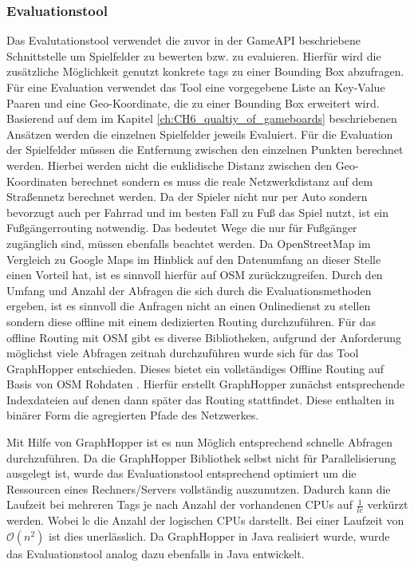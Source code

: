 \subsubsection*{Evaluationstool}

Das Evalutationstool verwendet die zuvor in der GameAPI beschriebene Schnittstelle um Spielfelder zu bewerten bzw. zu evaluieren. Hierfür wird die zusätzliche Möglichkeit genutzt konkrete tags zu einer Bounding Box abzufragen. Für eine Evaluation verwendet das Tool eine vorgegebene Liste an Key-Value Paaren und eine Geo-Koordinate, die zu einer Bounding Box erweitert wird. Basierend auf dem im Kapitel \ref{ch:CH6_qualtiy_of_gameboards} beschriebenen Ansätzen werden die einzelnen Spielfelder jeweils Evaluiert. Für die Evaluation der Spielfelder müssen die Entfernung zwischen den einzelnen Punkten berechnet werden. Hierbei werden nicht die euklidische Distanz zwischen den Geo-Koordinaten berechnet sondern es muss die reale Netzwerkdistanz auf dem Straßennetz berechnet werden. Da der Spieler nicht nur per Auto sondern bevorzugt auch per Fahrrad und im besten Fall zu Fuß das Spiel nutzt, ist ein Fußgängerrouting notwendig. Das bedeutet Wege die nur für Fußgänger zugänglich sind, müssen ebenfalls beachtet werden. Da OpenStreetMap im Vergleich zu Google Maps im Hinblick auf den Datenumfang an dieser Stelle einen Vorteil hat, ist es sinnvoll hierfür auf OSM zurückzugreifen. Durch den Umfang und Anzahl der Abfragen die sich durch die Evaluationsmethoden ergeben, ist es sinnvoll die Anfragen nicht an einen Onlinedienst zu stellen sondern diese offline mit einem dedizierten Routing durchzuführen. Für das offline Routing mit OSM gibt es diverse Bibliotheken, aufgrund der Anforderung möglichst viele Abfragen zeitnah durchzuführen wurde sich für das Tool GraphHopper entschieden. Dieses bietet ein vollständiges Offline Routing auf Basis von OSM Rohdaten \cite{Karich.2014}. Hierfür erstellt GraphHopper zunächst entsprechende Indexdateien auf denen dann später das Routing stattfindet. Diese enthalten in binärer Form die agregierten Pfade des Netzwerkes.

Mit Hilfe von GraphHopper ist es nun Möglich entsprechend schnelle Abfragen durchzuführen. Da die GraphHopper Bibliothek selbst nicht für Parallelisierung ausgelegt ist, wurde das Evaluationstool entsprechend optimiert um die Ressourcen eines Rechners/Servers vollständig auszunutzen. Dadurch kann die Laufzeit bei mehreren Tags je nach Anzahl der vorhandenen CPUs auf $\frac{1}{lc}$ verkürzt werden. Wobei lc die Anzahl der logischen CPUs darstellt. Bei einer Laufzeit von $\mathcal O(n^2)$ ist dies unerlässlich.
Da GraphHopper in Java realisiert wurde, wurde das Evaluationstool analog dazu ebenfalls in Java entwickelt.


